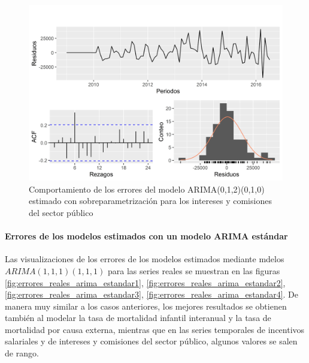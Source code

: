 \documentclass[
]{article}
\begin{document}
\begin{figure}[H]
\includegraphics[width=1\linewidth,height=1\textheight]{Tesis_files/figure-latex/errores_reales_sobreparametrizacion4-1} \caption{Comportamiento de los errores del modelo ARIMA(0,1,2)(0,1,0) estimado con sobreparametrización para los intereses y comisiones del sector público}\label{fig:errores_reales_sobreparametrizacion4}
\end{figure}

\paragraph{Errores de los modelos estimados con un modelo ARIMA estándar}

Las visualizaciones de los errores de los modelos estimados mediante
mdelos \(ARIMA(1,1,1)(1,1,1)\) para las series reales se muestran en las
figuras \ref{fig:errores_reales_arima_estandar1},
\ref{fig:errores_reales_arima_estandar2},
\ref{fig:errores_reales_arima_estandar3},
\ref{fig:errores_reales_arima_estandar4}. De manera muy similar a los
casos anteriores, los mejores resultados se obtienen también al modelar
la tasa de mortalidad infantil interanual y la tasa de mortalidad por
causa externa, mientras que en las series temporales de incentivos
salariales y de intereses y comisiones del sector público, algunos
valores se salen de rango.
\end{document}
